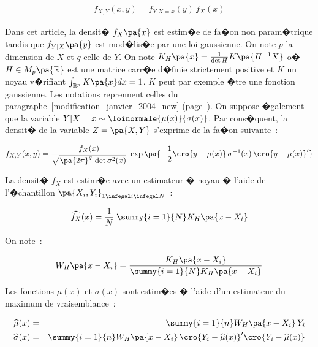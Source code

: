         \begin{eqnarray}
        f_{X,Y}(x,y) = f_{Y | X=x}(y) \, f_X(x)
        \end{eqnarray}

Dans cet article, la densit� $f_X\pa{x}$ est estim�e de fa�on non param�trique tandis que $f_{Y|X}\pa{y}$ est mod�lis�e par une loi gaussienne. On note $p$ la dimension de $X$ et $q$ celle de $Y$. On note $K_H \pa{x} = \frac{1}{\det H} K \pa{H^{-1} X}$ o� $H \in M_p\pa{\mathbb{R}}$ est une matrice carr�e d�finie strictement positive et $K$ un noyau v�rifiant $\int_{\mathbb{R}^p} K\pa{x} dx = 1$. $K$ peut par exemple �tre une fonction gaussienne. Les notations reprennent celles du paragraphe~\ref{modification_janvier_2004_new} (page~\pageref{modification_janvier_2004_new}). On suppose �galement que la variable $Y | X=x \sim \loinormale{\mu(x)}{\sigma(x)}$. Par cons�quent, la densit� de la variable $Z =\pa{X,Y}$ s'exprime de la fa�on suivante~:


        \begin{eqnarray}
        f_{X,Y}(x,y) =  \frac{ f_X(x) } { \sqrt{ \pa{2 \pi}^q \, \det \sigma^2(x) } } \;
                                        \exp \pa{ - \frac{1}{2} \cro{y - \mu(x)} \, \sigma^{-1}(x) \, \cro{y - \mu(x)}' }
        \end{eqnarray}


La densit� $f_X$ est estim�e avec un estimateur � noyau � l'aide de l'�chantillon $\pa{X_i,Y_i}_{1 \infegal i \infegal N}$~:

        
        \begin{eqnarray}
        \widehat{f_X} (x) = \frac{1}{N} \; \summy{i=1}{N} K_{H} \pa{ x - X_i}
        \end{eqnarray}

On note~:

        \begin{eqnarray}
        W_H\pa{x - X_i} =  \frac{K_H\pa{x - X_i}} {\summy{i=1}{N} K_H\pa{x - X_i} }
        \end{eqnarray}
        
Les fonctions $\mu(x)$ et $\sigma(x)$ sont estim�es � l'aide d'un estimateur du maximum de vraisemblance~:
        
        \begin{eqnarray}
        \widehat{\mu}(x)         &=& \summy{i=1}{n} W_H\pa{x - X_i} \, Y_i \\
        \widehat{\sigma}(x) &=& \summy{i=1}{n} W_H\pa{x - X_i} \, 
                                                        \cro{Y_i - \widehat{\mu}(x)}' \cro{Y_i - \widehat{\mu}(x)} 
        \end{eqnarray}

